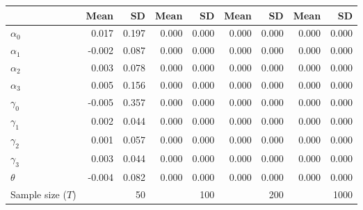 
\begin{tabular}[t]{lrrrrrrrr}
\toprule
  & Mean & SD & Mean  & SD  & Mean   & SD   & Mean    & SD   \\
\midrule
$\alpha_{0}$ & 0.017 & 0.197 & 0.000 & 0.000 & 0.000 & 0.000 & 0.000 & 0.000\\
$\alpha_{1}$ & -0.002 & 0.087 & 0.000 & 0.000 & 0.000 & 0.000 & 0.000 & 0.000\\
$\alpha_{2}$ & 0.003 & 0.078 & 0.000 & 0.000 & 0.000 & 0.000 & 0.000 & 0.000\\
$\alpha_{3}$ & 0.005 & 0.156 & 0.000 & 0.000 & 0.000 & 0.000 & 0.000 & 0.000\\
$\gamma_{0}$ & -0.005 & 0.357 & 0.000 & 0.000 & 0.000 & 0.000 & 0.000 & 0.000\\
$\gamma_{1}$ & 0.002 & 0.044 & 0.000 & 0.000 & 0.000 & 0.000 & 0.000 & 0.000\\
$\gamma_{2}$ & 0.001 & 0.057 & 0.000 & 0.000 & 0.000 & 0.000 & 0.000 & 0.000\\
$\gamma_{3}$ & 0.003 & 0.044 & 0.000 & 0.000 & 0.000 & 0.000 & 0.000 & 0.000\\
$\theta$ & -0.004 & 0.082 & 0.000 & 0.000 & 0.000 & 0.000 & 0.000 & 0.000\\
Sample size ($T$) &  & 50 &  & 100 &  & 200 &  & 1000\\
\bottomrule
\end{tabular}
